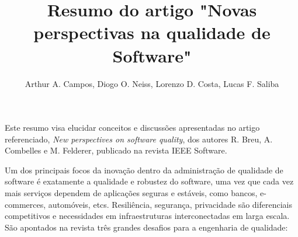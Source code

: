 \documentclass[14pt]{article}
\begin{document}
 



\title{Resumo do artigo "Novas perspectivas na qualidade de Software"}

\author{Arthur A. Campos, Diogo O. Neiss, Lorenzo D. Costa, Lucas F. Saliba}
  

\address{Graduandos em Ciência da Computação \\
Pontifícia Universidade Católica de Minas Gerais
(PUC MG)\\
Av. Dom José Gaspar, 500 Coração Eucarístico - Belo Horizonte - MG 30535-901, Brasil\\
}

\maketitle
     

Este resumo visa elucidar conceitos e discussões apresentadas no artigo referenciado, \textit{New perspectives on software quality}, dos autores R. Breu, A. Combelles e  M. Felderer, publicado na revista IEEE Software.

Um dos principais focos da inovação dentro da administração de qualidade de software é exatamente a qualidade e robustez do software, uma vez que cada vez mais serviços dependem de aplicações seguras e estáveis, como bancos, e-commerces, automóveis, etcs. Resiliência, segurança, privacidade são diferenciais competitivos e necessidades em infraestruturas interconectadas em larga escala.\\
São apontados na revista três grandes desafios para a engenharia de qualidade:
\end{document}
